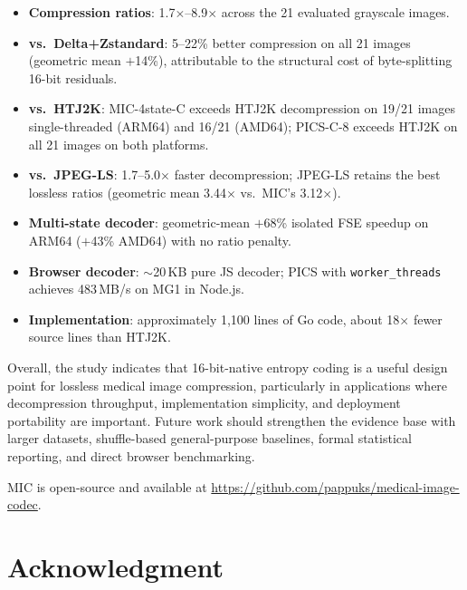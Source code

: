 \documentclass[journal]{IEEEtran}
\begin{document}
\begin{itemize}
  \item \textbf{Compression ratios}: 1.7$\times$--8.9$\times$ across the 21
  evaluated grayscale images.

  \item \textbf{vs.\ Delta+Zstandard}: 5--22\% better compression on all 21
  images (geometric mean $+$14\%), attributable to the structural cost of
  byte-splitting 16-bit residuals.

  \item \textbf{vs.\ HTJ2K}: MIC-4state-C exceeds HTJ2K decompression on 19/21
  images single-threaded (ARM64) and 16/21 (AMD64); PICS-C-8 exceeds HTJ2K on
  all 21 images on both platforms.

  \item \textbf{vs.\ JPEG-LS}: 1.7--5.0$\times$ faster decompression; JPEG-LS
  retains the best lossless ratios (geometric mean 3.44$\times$ vs.\ MIC's
  3.12$\times$).

  \item \textbf{Multi-state decoder}: geometric-mean $+$68\% isolated FSE
  speedup on ARM64 ($+$43\% AMD64) with no ratio penalty.

  \item \textbf{Browser decoder}: ${\sim}$20\,KB pure JS decoder; PICS with
  \texttt{worker\_threads} achieves 483\,MB/s on MG1 in Node.js.

  \item \textbf{Implementation}: approximately 1,100 lines of Go code, about
  18$\times$ fewer source lines than HTJ2K.
\end{itemize}

Overall, the study indicates that 16-bit-native entropy coding is a useful
design point for lossless medical image compression, particularly in
applications where decompression throughput, implementation simplicity, and
deployment portability are important. Future work should strengthen the evidence
base with larger datasets, shuffle-based general-purpose baselines, formal
statistical reporting, and direct browser benchmarking.

MIC is open-source and available at
\url{https://github.com/pappuks/medical-image-codec}.

\section*{Acknowledgment}
\end{document}
